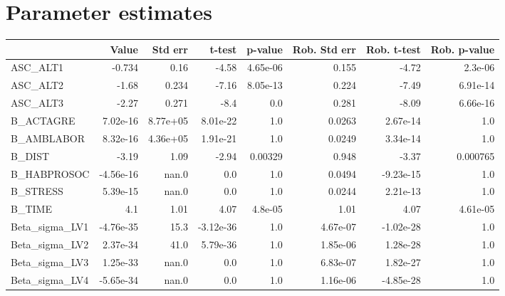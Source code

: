 \section{Parameter estimates}
\begin{tabular}{lrrrrrrr}
\toprule
{} &     Value &  Std err &    t-test &  p-value &  Rob. Std err &  Rob. t-test &  Rob. p-value \\
\midrule
ASC\_ALT1       &    -0.734 &     0.16 &     -4.58 & 4.65e-06 &         0.155 &        -4.72 &       2.3e-06 \\
ASC\_ALT2       &     -1.68 &    0.234 &     -7.16 & 8.05e-13 &         0.224 &        -7.49 &      6.91e-14 \\
ASC\_ALT3       &     -2.27 &    0.271 &      -8.4 &      0.0 &         0.281 &        -8.09 &      6.66e-16 \\
B\_ACTAGRE      &  7.02e-16 & 8.77e+05 &  8.01e-22 &      1.0 &        0.0263 &     2.67e-14 &           1.0 \\
B\_AMBLABOR     &  8.32e-16 & 4.36e+05 &  1.91e-21 &      1.0 &        0.0249 &     3.34e-14 &           1.0 \\
B\_DIST         &     -3.19 &     1.09 &     -2.94 &  0.00329 &         0.948 &        -3.37 &      0.000765 \\
B\_HABPROSOC    & -4.56e-16 &    nan.0 &       0.0 &      1.0 &        0.0494 &    -9.23e-15 &           1.0 \\
B\_STRESS       &  5.39e-15 &    nan.0 &       0.0 &      1.0 &        0.0244 &     2.21e-13 &           1.0 \\
B\_TIME         &       4.1 &     1.01 &      4.07 &  4.8e-05 &          1.01 &         4.07 &      4.61e-05 \\
Beta\_sigma\_LV1 & -4.76e-35 &     15.3 & -3.12e-36 &      1.0 &      4.67e-07 &    -1.02e-28 &           1.0 \\
Beta\_sigma\_LV2 &  2.37e-34 &     41.0 &  5.79e-36 &      1.0 &      1.85e-06 &     1.28e-28 &           1.0 \\
Beta\_sigma\_LV3 &  1.25e-33 &    nan.0 &       0.0 &      1.0 &      6.83e-07 &     1.82e-27 &           1.0 \\
Beta\_sigma\_LV4 & -5.65e-34 &    nan.0 &       0.0 &      1.0 &      1.16e-06 &    -4.85e-28 &           1.0 \\
\bottomrule
\end{tabular}

